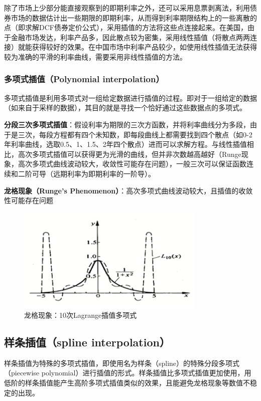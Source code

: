\documentclass[11pt]{article}
\begin{document}
除了市场上少部分能直接观察到的即期利率之外，还可以采用息票剥离法，利用债券市场的数据估计出一些期限的即期利率，从而得到利率期限结构上的一些离散的点（即求解DCF债券定价公式），采用插值的方法将这些点连接起来。在美国，由于金融市场发达，利率产品多，因此散点较为密集，采用线性插值（将散点两两连接）就能获得较好的效果。在中国市场中利率产品较少，如使用线性插值无法获得较为准确的平滑的利率曲线，需要采用非线性插值的方法。

\subsubsection*{多项式插值（Polynomial interpolation）}

多项式插值是利用多项式对一组给定数据进行插值的过程。即对于一组给定的数据（如来自于采样的数据），其目的就是寻找一个恰好通过这些数据点的多项式。

\textbf{分段三次多项式插值}：假设利率为期限的三次方函数，并将利率曲线分为多段，由于是三次，每段方程都有四个未知数，即每段曲线上都需要找到四个散点（如0-2年利率曲线，选取0.5、1、1.5、2年四个散点）进而可以求解方程。与线性插值相比，高次多项式插值可以获得更为光滑的曲线，但并非次数越高越好（Runge现象，高次多项式曲线波动较大，收敛性可能存在问题），一般三次可以保证函数连续和二阶可导（远期利率为即期利率的一阶导）。

\textbf{龙格现象（Runge's Phenomenon）}：高次多项式曲线波动较大，且插值的收敛性可能存在问题
\begin{figure}[H]
    \centering
    \includegraphics[width=0.8\textwidth]{fig/runges-phenomenon.png}
	\caption{龙格现象：10次Lagrange插值多项式}
    \label{fig:runges-phenomenon}
\end{figure}

\subsection*{样条插值（spline interpolation）}

样条插值为特殊的多项式插值，即使用名为样条（spline）的特殊分段多项式（piecewise polynomial）进行插值的形式。样条插值比多项式插值更加使用，用低阶的样条插值能产生高阶多项式插值类似的效果，且能避免龙格现象等数值不稳定的出现。
\end{document}
